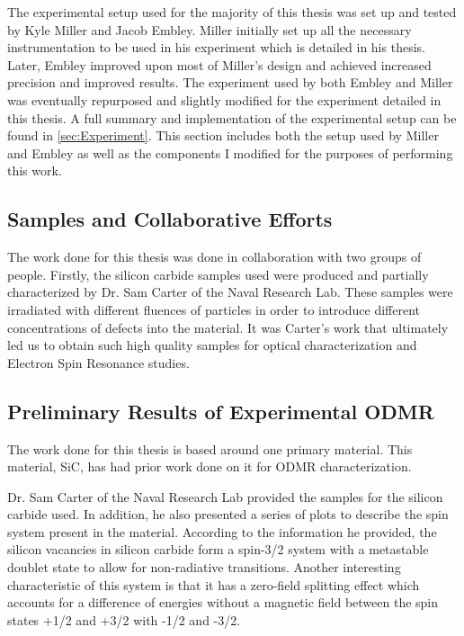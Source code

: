 \documentclass[oneside, astronomy, noacknowlegments]{BYUPhys}
\begin{document}
The experimental setup used for the majority of this thesis was set up and tested by Kyle Miller and Jacob Embley. Miller initially set up all the necessary instrumentation to be used in his experiment which is detailed in his thesis. Later, Embley improved upon most of Miller's design and achieved increased precision and improved results. The experiment used by both Embley and Miller was eventually repurposed and slightly modified for the experiment detailed in this thesis. A full summary and implementation of the experimental setup can be found in \ref{sec:Experiment}. This section includes both the setup used by Miller and Embley as well as the components I modified for the purposes of performing this work.

\subsection{Samples and Collaborative Efforts}

The work done for this thesis was done in collaboration with two groups of people. Firstly, the silicon carbide samples used were produced and partially characterized by Dr. Sam Carter of the Naval Research Lab. These samples were irradiated with different fluences of particles in order to introduce different concentrations of defects into the material. It was Carter's work that ultimately led us to obtain such high quality samples for optical characterization and Electron Spin Resonance studies.

\subsection{Preliminary Results of Experimental ODMR}

The work done for this thesis is based around one primary material. This material, SiC, has had prior work done on it for ODMR characterization.

Dr. Sam Carter of the Naval Research Lab provided the samples for the silicon carbide used. In addition, he also presented a series of plots to describe the spin system present in the material. According to the information he provided, the silicon vacancies in silicon carbide form a spin-3/2 system with a metastable doublet state to allow for non-radiative transitions. Another interesting characteristic of this system is that it has a zero-field splitting effect which accounts for a difference of energies without a magnetic field between the spin states +1/2 and +3/2 with -1/2 and -3/2.
\end{document}
